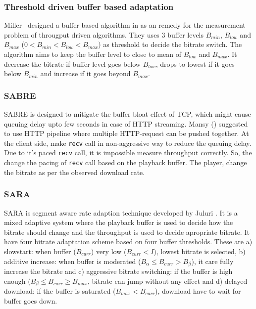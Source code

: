 \subsubsection{Threshold driven buffer based adaptation\cite{6229732}}
Miller \etal\ designed a buffer based algorithm in \cite{6229732} as an remedy for the measurement problem of througput driven algorithms. They uses 3 buffer levels $B_{min}$, $B_{low}$ and $B_{max}$ ($0 < B_{min} < B_{low} < B_{max}$) as threshold to decide the bitrate switch. The algorithm aims to keep the buffer level to close to mean of $B_{low}$ and $B_{max}$. It decrease the bitrate if buffer level goes below $B_{low}$, drops to lowest if it goes below $B_{min}$ and increase if it goes beyond $B_{max}$.

\subsubsection{SABRE\cite{10.1145/2483977.2484004}}
SABRE is designed to mitigate the buffer bloat effect of TCP, which might cause queuing delay upto few seconds in case of HTTP streaming. Mansy \etal(\cite{10.1145/2483977.2484004}) suggested to use HTTP pipeline where multiple HTTP-request can be pushed together. At the client side, make {\tt recv} call in non-aggressive way to reduce the queuing delay. Due to it's paced {\tt recv} call, it is impossible measure throughput correctly. So, the change the pacing of {\tt recv} call based on the playback buffer. The player, change the bitrate as per the observed download rate.

\subsubsection{SARA\cite{7247436}}
SARA\cite{7247436} is segment aware rate adaption technique developed by Juluri \etal. It is a mixed adaptive system where the playback buffer is used to decide how the bitrate should change and the throughput is used to decide apropriate bitrate. It have four bitrate adaptation scheme based on four buffer thresholds. These are a) slowstart: when buffer ($B_{curr}$) very low ($B_{curr}<I$), lowest bitrate is selected, b) additive increase: when buffer is moderated ($B_{\alpha} \le B_{curr} > B_{\beta}$), it care fully increase the bitrate and c) aggressive bitrate switching: if the buffer is high enough ($B_{\beta} \le B_{curr} \ge B_{max}$, bitrate can jump without any effect and d) delayed download: if the buffer is saturated ($B_{max} < B_{curr}$), download have to wait for buffer goes down.

